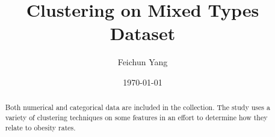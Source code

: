 \documentclass[a4paper]{article}
\title{Clustering on Mixed Types Dataset}
\author{Feichun Yang}
\date{\today}
\theoremstyle{plain}
\begin{document}
\maketitle

\begin{abstract}
Both numerical and categorical data are included in the collection. The study uses a variety of clustering techniques on some features in an effort to determine how they relate to obesity rates.
\end{abstract}





\end{document}

